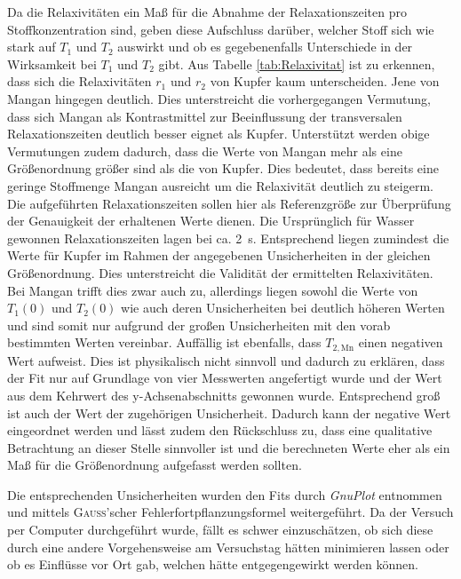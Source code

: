 Da die Relaxivitäten ein Maß für die Abnahme der Relaxationszeiten pro Stoffkonzentration sind, geben diese Aufschluss darüber, welcher Stoff sich wie stark auf $T_1$ und $T_2$ auswirkt und ob es gegebenenfalls Unterschiede in der Wirksamkeit bei $T_1$ und $T_2$ gibt.
Aus Tabelle \ref{tab:Relaxivitat} ist zu erkennen, dass sich die Relaxivitäten $r_1$ und $r_2$ von Kupfer kaum unterscheiden.
Jene von Mangan hingegen deutlich.
Dies unterstreicht die vorhergegangen Vermutung, dass sich Mangan als Kontrastmittel zur Beeinflussung der transversalen Relaxationszeiten deutlich besser eignet als Kupfer.
Unterstützt werden obige Vermutungen zudem dadurch, dass die Werte von Mangan mehr als eine Größenordnung größer sind als die von Kupfer.
Dies bedeutet, dass bereits eine geringe Stoffmenge Mangan ausreicht um die Relaxivität deutlich zu steigerm.
Die aufgeführten Relaxationszeiten sollen hier als Referenzgröße zur Überprüfung der Genauigkeit der erhaltenen Werte dienen.
Die Ursprünglich für Wasser gewonnen Relaxationszeiten lagen bei ca. \SI{2}{\second}.
Entsprechend liegen zumindest die Werte für Kupfer im Rahmen der angegebenen Unsicherheiten in der gleichen Größenordnung.
Dies unterstreicht die Validität der ermittelten Relaxivitäten.
Bei Mangan trifft dies zwar auch zu, allerdings liegen sowohl die Werte von $T_1(0)$ und $T_2(0)$ wie auch deren Unsicherheiten bei deutlich höheren Werten und sind somit nur aufgrund der großen Unsicherheiten mit den vorab bestimmten Werten vereinbar.
Auffällig ist ebenfalls, dass $T_{2,\text{Mn}}$ einen negativen Wert aufweist.
Dies ist physikalisch nicht sinnvoll und dadurch zu erklären, dass der Fit nur auf Grundlage von vier Messwerten angefertigt wurde und der Wert aus dem Kehrwert des y-Achsenabschnitts gewonnen wurde.
Entsprechend groß ist auch der Wert der zugehörigen Unsicherheit.
Dadurch kann der negative Wert eingeordnet werden und lässt zudem den Rückschluss zu, dass eine qualitative Betrachtung an dieser Stelle sinnvoller ist und die berechneten Werte eher als ein Maß für die Größenordnung aufgefasst werden sollten.

Die entsprechenden Unsicherheiten wurden den Fits durch \textit{GnuPlot} entnommen und mittels \textsc{Gauss}'scher Fehlerfortpflanzungsformel weitergeführt.
Da der Versuch per Computer durchgeführt wurde, fällt es schwer einzuschätzen, ob sich diese durch eine andere Vorgehensweise am Versuchstag hätten minimieren lassen oder ob es Einflüsse vor Ort gab, welchen hätte entgegengewirkt werden können.
    

%     
